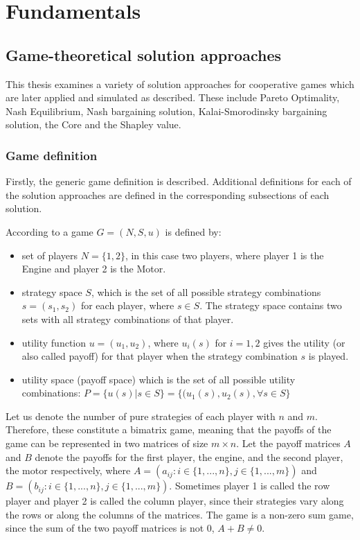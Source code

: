 \chapter{Fundamentals}
\label{chp:basics}

\section{Game-theoretical solution approaches}
This thesis examines a variety of solution approaches for cooperative games which are later applied and simulated as described. These include Pareto Optimality, Nash Equilibrium, Nash bargaining solution, Kalai-Smorodinsky bargaining solution, the Core and the Shapley value.

\subsection{Game definition}
Firstly, the generic game definition is described. Additional definitions for each of the solution approaches are defined in the corresponding subsections of each solution.

According to \citet{holler2006einfuhrung} a game $G = (N,S,u)$ is defined by:
\begin{itemize}
\item
set of players $N = \{1,2\}$, in this case two players, where player 1 is the Engine and player 2 is the Motor.
\item
strategy space $S$, which is the set of all possible strategy combinations $s=(s_1,s_2)$ for each player, where $s\in S$. The strategy space contains two sets with all strategy combinations of that player.
\item
utility function $u = (u_1,u_2)$, where $u_i(s)$ for $i=1,2$ gives the utility (or also called payoff) for that player when the strategy combination $s$ is played.
\item
utility space (payoff space) which is the set of all possible utility combinations:
$P = \{u(s)|s \in S\} = \{(u_1(s),u_2(s),  \forall s \in S\}$
\end{itemize} 

Let us denote the number of pure strategies of each player with $n$ and $m$. Therefore, these constitute a bimatrix game, meaning that the payoffs of the game can be represented in two matrices of size $m \times n$. Let the payoff matrices $A$ and $B$ denote the payoffs for the first player, the engine, and the second player, the motor respectively, where $A = (a_{ij}: i \in \{1,...,n\}, j \in \{ 1,...,m\})$ and $B = (b_{ij}: i \in \{1,...,n\}, j \in \{ 1,...,m\})$. Sometimes player 1 is called the row player and player 2 is called the column player, since their strategies vary along the rows or along the columns of the matrices. The game is a non-zero sum game, since the sum of the two payoff matrices is not 0, $A + B \neq 0$.

